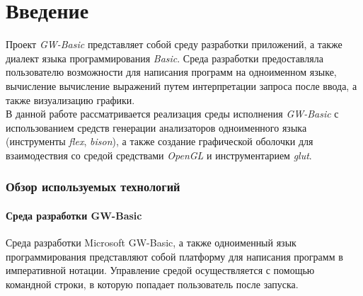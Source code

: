 \documentclass[12pt]{article}
\begin{document}
	\part*{\centering Введение}
	\hspace{\parindent} Проект {\it GW-Basic} представляет собой среду разработки приложений, а также диалект языка программирования {\it Basic}. Среда разработки предоставляла пользователю возможности для написания программ на одноименном языке, вычисление вычисление выражений путем интерпретации запроса после ввода, а также визуализацию графики. \\
	\indent В данной работе рассматривается реализация среды исполнения {\it GW-Basic} с использованием средств генерации анализаторов одноименного языка (инструменты {\it flex}, {\it bison}), а также создание графической оболочки для взаимодествия со средой средствами {\it OpenGL} и инструментарием {\it glut}. 
	\newpage
	\section{Обзор используемых технологий}	
		\subsection{Среда разработки GW-Basic}
			\hspace{\parindent} Среда разработки Microsoft GW-Basic, а также одноименный язык программирования представляют собой платформу для написания программ в императивной нотации. 
			Управление средой осуществляется с помощью командной строки, в которую попадает пользователь после запуска.
\end{document}
